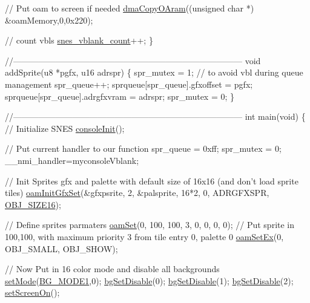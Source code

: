 \begin{DoxyCodeInclude}
    \textcolor{comment}{// Put oam to screen if needed}
    \hyperlink{a00323_a2f9585bce8262424ff3e8121c6a9e44e}{dmaCopyOAram}((\textcolor{keywordtype}{unsigned} \textcolor{keywordtype}{char} *) &oamMemory,0,0x220);
    
    \textcolor{comment}{// count vbls}
    \hyperlink{a00320_a5e14b74b621c822db9af978d0ad31d1a}{snes\_vblank\_count}++;
\}

\textcolor{comment}{//---------------------------------------------------------------------------------}
\textcolor{keywordtype}{void} addSprite(u8 *pgfx, u16 adrspr) \{
    spr\_mutex = 1; \textcolor{comment}{// to avoid vbl during queue management}
    spr\_queue++;
    sprqueue[spr\_queue].gfxoffset = pgfx;
    sprqueue[spr\_queue].adrgfxvram = adrspr;
    spr\_mutex = 0;
\}

\textcolor{comment}{//---------------------------------------------------------------------------------}
\textcolor{keywordtype}{int} main(\textcolor{keywordtype}{void}) \{
    \textcolor{comment}{// Initialize SNES }
    \hyperlink{a00320_a6047713bb5a73afd3cd1d77e336bcdad}{consoleInit}();
    
    \textcolor{comment}{// Put current handler to our function}
    spr\_queue = 0xff; spr\_mutex = 0;
    \_\_nmi\_handler=myconsoleVblank; 

    \textcolor{comment}{// Init Sprites gfx and palette with default size of 16x16 (and don't load sprite tiles)}
    \hyperlink{a00350_a46e0be47f8fc865a7f43c1b0b126e59a}{oamInitGfxSet}(&gfxpsrite, 2, &palsprite, 16*2, 0, ADRGFXSPR, 
      \hyperlink{a00350_a35664c2c4a66c3bac8139ae093d7f3ac}{OBJ\_SIZE16});

    \textcolor{comment}{// Define sprites parmaters}
    \hyperlink{a00350_a2f62a591672b786d90ebb03fdf25f159}{oamSet}(0,  100, 100, 3, 0, 0, 0, 0); \textcolor{comment}{// Put sprite in 100,100, with maximum priority 3 from tile
       entry 0, palette 0}
    \hyperlink{a00350_a4120a8ff32c39973babeca3615a0a2fd}{oamSetEx}(0, OBJ\_SMALL, OBJ\_SHOW);
    
    \textcolor{comment}{// Now Put in 16 color mode and disable all backgrounds}
    \hyperlink{a00353_afd9e46ae627d055dd8c98a4b0ebb73b1}{setMode}(\hyperlink{a00317_a05c862edb7f8f75036f10c04dcc3c2a6}{BG\_MODE1},0); \hyperlink{a00317_a4dbfb1b8854ff9ca4a7d11a899281bbb}{bgSetDisable}(0); 
      \hyperlink{a00317_a4dbfb1b8854ff9ca4a7d11a899281bbb}{bgSetDisable}(1); \hyperlink{a00317_a4dbfb1b8854ff9ca4a7d11a899281bbb}{bgSetDisable}(2);
    \hyperlink{a00353_abc7d4ef8ebc22f5b710927909bb3f144}{setScreenOn}();


\end{DoxyCodeInclude}
